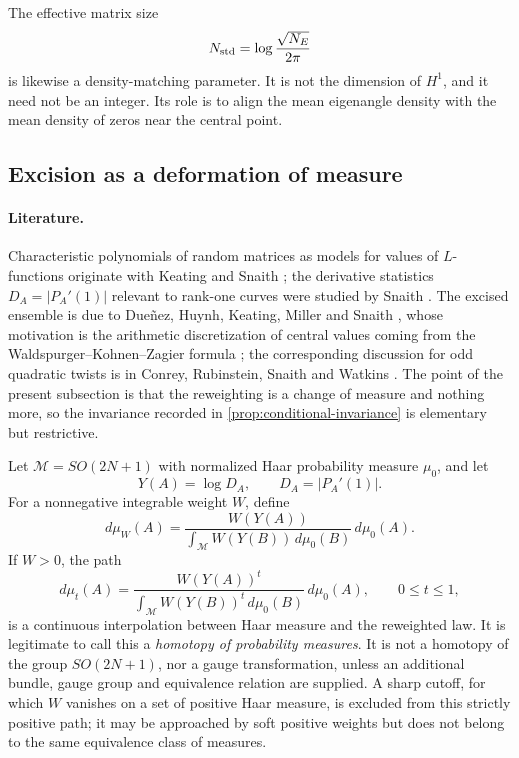 \documentclass[11pt,reqno]{amsart}
\theoremstyle{remark}
\begin{document}
The effective matrix size
\begin{equation}
  N_{\rm std}=\log\frac{\sqrt{N_E}}{2\pi}
\end{equation}
is likewise a density-matching parameter.  It is not the dimension of $H^1$, and it need not be an integer.  Its role is to align the mean eigenangle density with the mean density of zeros near the central point.

\subsection{Excision as a deformation of measure}
\label{subsec:excision-measure}

\paragraph{Literature.}
Characteristic polynomials of random matrices as models for values of $L$-functions originate with Keating and Snaith \cite{KeatingSnaith2000}; the derivative statistics $D_A=|P_A'(1)|$ relevant to rank-one curves were studied by Snaith \cite{Snaith2005}.  The excised ensemble is due to Due\~nez, Huynh, Keating, Miller and Snaith \cite{DHKMS2012}, whose motivation is the arithmetic discretization of central values coming from the Waldspurger--Kohnen--Zagier formula \cite{KohnenZagier1981}; the corresponding discussion for odd quadratic twists is in Conrey, Rubinstein, Snaith and Watkins \cite{CRSW2007}.  The point of the present subsection is that the reweighting is a change of measure and nothing more, so the invariance recorded in \cref{prop:conditional-invariance} is elementary but restrictive.

Let $\mathcal M=SO(2N+1)$ with normalized Haar probability measure $\mu_0$, and let
\begin{equation}
  Y(A)=\log D_A,
  \qquad D_A=|P_A'(1)|.
\end{equation}
For a nonnegative integrable weight $W$, define
\begin{equation}
  d\mu_W(A)
  =\frac{W(Y(A))}{\int_{\mathcal M}W(Y(B))\,d\mu_0(B)}\,d\mu_0(A).
  \label{eq:weighted-Haar-measure}
\end{equation}
If $W>0$, the path
\begin{equation}
  d\mu_t(A)
  =\frac{W(Y(A))^t}{\int_{\mathcal M}W(Y(B))^t\,d\mu_0(B)}\,d\mu_0(A),
  \qquad 0\le t\le1,
  \label{eq:measure-homotopy}
\end{equation}
is a continuous interpolation between Haar measure and the reweighted law.  It is legitimate to call this a \emph{homotopy of probability measures}.  It is not a homotopy of the group $SO(2N+1)$, nor a gauge transformation, unless an additional bundle, gauge group and equivalence relation are supplied.  A sharp cutoff, for which $W$ vanishes on a set of positive Haar measure, is excluded from this strictly positive path; it may be approached by soft positive weights but does not belong to the same equivalence class of measures.
\end{document}
